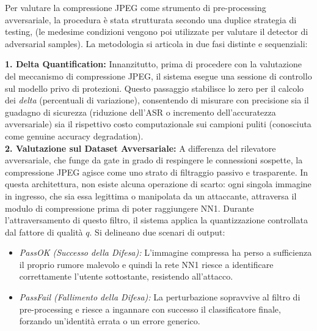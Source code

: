 \documentclass[a4paper, 12pt]{article}
\begin{document}
\vspace{7pt}

Per valutare la compressione JPEG come strumento di 
pre-processing avversariale, la procedura è stata strutturata secondo una duplice strategia di testing,
(le medesime condizioni vengono poi utilizzate per valutare il detector di adversarial samples). 
La metodologia si articola in due fasi distinte e sequenziali:

\vspace{5pt}


\textbf{1. Delta Quantification:}
Innanzitutto, prima di procedere con la valutazione del meccanismo di compressione JPEG, il sistema esegue una sessione 
di controllo sul modello privo di protezioni. Questo passaggio stabilisce lo zero per il calcolo dei \textit{delta} 
(percentuali di variazione), consentendo di misurare con precisione sia il guadagno di sicurezza (riduzione dell'ASR o 
incremento dell'accuratezza avversariale) sia il rispettivo costo computazionale sui campioni puliti 
(conosciuta come genuine accuracy degradation).\\

\textbf{2. Valutazione sul Dataset Avversariale:}
A differenza del rilevatore avversariale, che funge da gate in grado di respingere 
le connessioni sospette, la compressione JPEG agisce come uno strato di filtraggio passivo e trasparente. 
In questa architettura, non esiste alcuna operazione di scarto: ogni singola immagine in ingresso, che sia essa 
legittima o manipolata da un attaccante, attraversa il modulo di compressione prima di poter 
raggiungere NN1. Durante l'attraversamento di questo filtro, il sistema 
applica la quantizzazione controllata dal fattore di qualità $q$.
Si delineano due scenari di output:
\begin{itemize}
    \item \textit{PassOK (Successo della Difesa):} L'immagine compressa ha perso a sufficienza il proprio rumore malevolo
    e quindi la rete NN1 riesce a identificare correttamente l'utente sottostante,
    resistendo all'attacco.
    \item \textit{PassFail (Fallimento della Difesa):} La perturbazione sopravvive al filtro di pre-processing 
    e riesce a ingannare con successo il classificatore finale, forzando un'identità errata o un errore generico.
\end{itemize}
\end{document}
